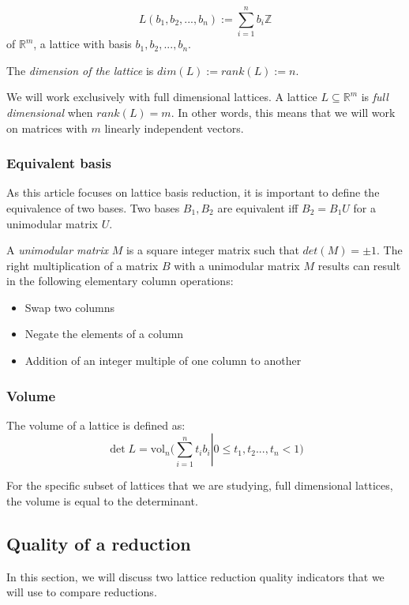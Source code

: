 \documentclass[10pt]{article}
\begin{document}
\[
L(b_1,b_2,...,b_n):= \displaystyle\sum_{i=1}^{n}b_i \mathbb{Z}
\] of $\mathbb{R}^m$, a lattice with basis $b_1,b_2,...,b_n$.  

The \emph{dimension of the lattice} is $dim(L) := rank(L) := n$. 

We will work exclusively with full dimensional lattices. A lattice $L \subseteq \mathbb{R}^m$ is \emph{full dimensional} when $rank(L)=m$. In other words, this means that we will work on matrices with $m$ linearly independent vectors.

\subsubsection{Equivalent basis}

As this article focuses on lattice basis reduction, it is important to define the equivalence of two bases. Two bases $B_1 , B_2$ are equivalent iff $B_2 = B_1 U$ for a unimodular matrix $U$.

A \emph{unimodular matrix} $M$ is a square integer matrix such that $det(M) = \pm 1$. The right multiplication of a matrix $B$ with a unimodular matrix $M$ results can result in the following elementary column operations:
\begin{itemize}
\item Swap two columns
\item Negate the elements of a column
\item Addition of an integer multiple of one column to another
\end{itemize}


\subsubsection{Volume}

The volume of a lattice is defined\cite{SchnorrStanfordNotes} as:
\[
\det L = \text{vol}_n \left. \Big( \displaystyle\sum_{i=1}^{n} t_i b_i \right| 0 \leq t_1, t_2 ..., t_n < 1 \Big)
\]

For the specific subset of lattices that we are studying, full dimensional lattices, the volume is equal to the determinant.

\subsection{Quality of a reduction}

In this section, we will discuss two lattice reduction quality indicators that we will use to compare reductions.
\end{document}

